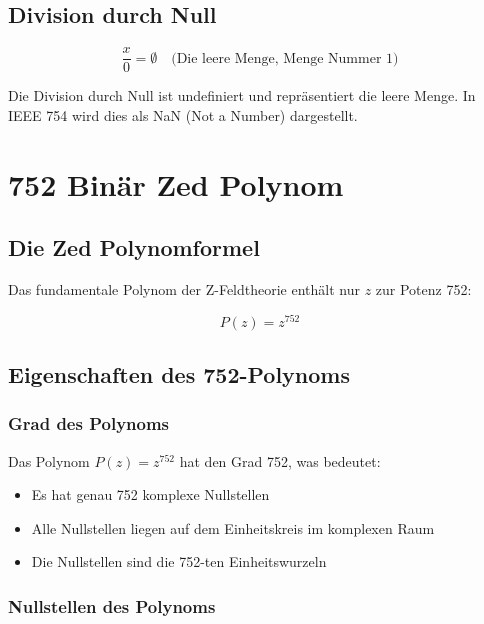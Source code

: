 \documentclass[12pt]{book}
\begin{document}
\section{Division durch Null}

\begin{equation}
\frac{x}{0} = \emptyset \quad \text{(Die leere Menge, Menge Nummer 1)}
\end{equation}

Die Division durch Null ist undefiniert und repräsentiert die leere Menge. In IEEE 754 wird dies als NaN (Not a Number) dargestellt.

\chapter{752 Binär Zed Polynom}

\section{Die Zed Polynomformel}

Das fundamentale Polynom der Z-Feldtheorie enthält nur $z$ zur Potenz 752:

\begin{equation}
\boxed{P(z) = z^{752}}
\end{equation}

\section{Eigenschaften des 752-Polynoms}

\subsection{Grad des Polynoms}

Das Polynom $P(z) = z^{752}$ hat den Grad 752, was bedeutet:

\begin{itemize}
\item Es hat genau 752 komplexe Nullstellen
\item Alle Nullstellen liegen auf dem Einheitskreis im komplexen Raum
\item Die Nullstellen sind die 752-ten Einheitswurzeln
\end{itemize}

\subsection{Nullstellen des Polynoms}
\end{document}
